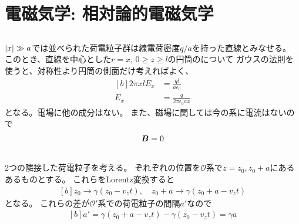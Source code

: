 \documentclass[../../sp_2014.tex]{subfiles}
\begin{document}
\section{電磁気学: 相対論的電磁気学}
\subsection{}
\(\abs{x}\gg a\)では並べられた荷電粒子群は線電荷密度\(q/a\)を持った直線とみなせる。
このとき、直線を中心とした\(r=x,\,0\geq z\geq l\)の円筒のについて
ガウスの法則を使うと、対称性より円筒の側面だけ考えればよく、
\begin{equation}\begin{aligned}[b]
     2\pi xlE_x &= \frac{ql}{a\epsilon_0}\\
     E_x &= \frac{q}{2\pi\epsilon_0ax}
\end{aligned}\end{equation}
となる。電場に他の成分はない。
また、磁場に関しては今の系に電流はないので
\begin{equation}\begin{aligned}[b]
    \vb*{B}=0
\end{aligned}\end{equation}

\subsection{}
2つの隣接した荷電粒子を考える。
ぞれぞれの位置を\(\mathcal{O}\)系で\(z=z_0,z_0+a\)にあるあるものとする。
これらをLorentz変換すると
\begin{equation}\begin{aligned}[b]
    z_0 \to \gamma(z_0-v_zt), \quad z_0+a \to \gamma(z_0+a-v_zt)
\end{aligned}\end{equation}
となる。
これらの差が\(\mathcal{O}'\)系での荷電粒子の間隔\(a'\)なので
\begin{equation}\begin{aligned}[b]
    a' = \gamma(z_0+a-v_zt)-\gamma(z_0-v_zt) = \gamma a
\end{aligned}\end{equation}
\end{document}
